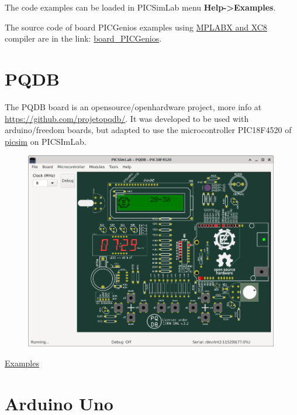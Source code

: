 The code examples can be loaded in PICSimLab menu \textbf{Help->Examples}.

The source code of board PICGenios examples using 
\href{http://www.microchip.com/mplabx}{MPLABX and XC8} compiler are in the link: 
\href{https://lcgamboa.github.io/picsimlab_examples/board_PICGenios.html}{board\_PICGenios}.




\section{PQDB}

The PQDB board is an opensource/openhardware project, more info at \href{https://github.com/projetopqdb/}{https://github.com/projetopqdb/}.
It was developed to be used with arduino/freedom boards, but adapted to use the microcontroller PIC18F4520 of 
\href{https://github.com/lcgamboa/picsim}{picsim} on PICSImLab.

\begin{figure}[H]
\center
\includegraphics[width=0.99\textwidth]{img/board_PQDB.png} 
\end{figure} 

\href{https://lcgamboa.github.io/picsimlab_examples/board_PQDB.html}{Examples}


\section{Arduino Uno}

